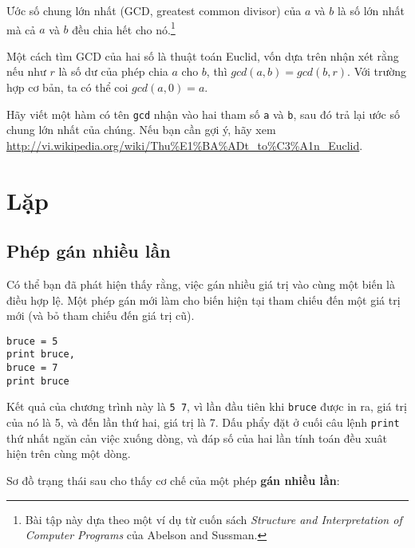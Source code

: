 \documentclass[11pt]{book}
\begin{document}
\begin{ex}


Ước số chung lớn nhất (GCD, greatest common divisor) của $a$ và $b$ 
là số lớn nhất mà cả $a$ và $b$ đều chia hết cho nó.\footnote{Bài tập này
dựa theo một ví dụ từ cuốn sách {\em Structure and
    Interpretation of Computer Programs} của Abelson and Sussman.}

Một cách tìm GCD của hai số là thuật toán Euclid, vốn dựa trên
nhận xét rằng nếu như $r$ là số dư của phép chia $a$ cho $b$, thì
$gcd(a, b) = gcd(b, r)$. Với trường hợp cơ bản, ta có thể coi $gcd(a, 0) = a$.


Hãy viết một hàm có tên 
\verb"gcd" nhận vào hai tham số {\tt a} và {\tt b}, sau đó
trả lại ước số chung lớn nhất của chúng. Nếu bạn cần gợi ý,
hãy xem \url{http://vi.wikipedia.org/wiki/Thu%E1%BA%ADt_to%C3%A1n_Euclid}.

\end{ex}


\chapter{Lặp}


\section{Phép gán nhiều lần}


Có thể bạn đã phát hiện thấy rằng, việc gán nhiều giá trị
vào cùng một biến là điều hợp lệ. Một phép gán mới làm cho
biến hiện tại tham chiếu đến một giá trị mới (và bỏ tham 
chiếu đến giá trị cũ).

\beforeverb
\begin{verbatim}
bruce = 5
print bruce,
bruce = 7
print bruce
\end{verbatim}
\afterverb
%
Kết quả của chương trình này là {\tt 5 7}, vì lần đầu tiên khi 
{\tt bruce} được in ra, giá trị của nó là 5, và đến lần thứ hai,
giá trị là 7.  Dấu phẩy đặt ở cuối câu lệnh {\tt print} thứ nhất
ngăn cản việc xuống dòng, và đáp số của hai lần tính toán đều
xuât hiện trên cùng một dòng.


Sơ đồ trạng thái sau cho thấy cơ chế của một phép {\bf gán nhiều lần}:
\end{document}
